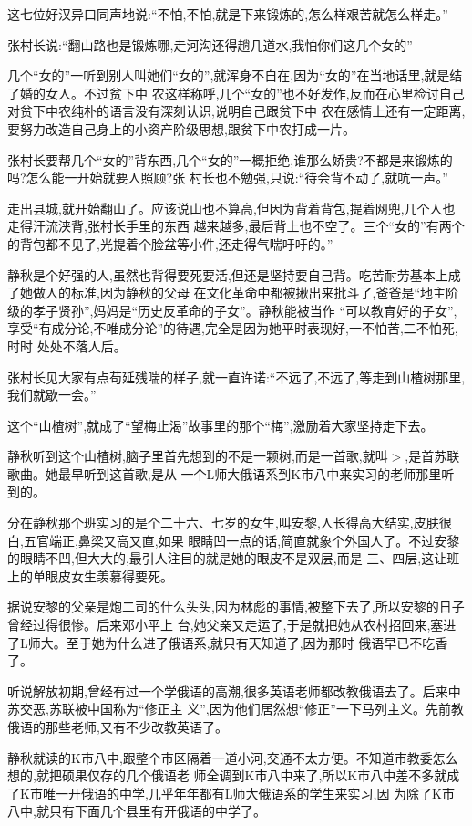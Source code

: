 ﻿\documentclass[12pt]{article}
\begin{document}
这七位好汉异口同声地说:``不怕,不怕,就是下来锻炼的,怎么样艰苦就怎么样走。''

张村长说:``翻山路也是锻炼哪,走河沟还得趟几道水,我怕你们这几个女的\myrule ''

几个``女的''一听到别人叫她们``女的'',就浑身不自在,因为``女的''在当地话里,就是结了婚的女人。不过贫下中
农这样称呼,几个``女的''也不好发作,反而在心里检讨自己对贫下中农纯朴的语言没有深刻认识,说明自己跟贫下中
农在感情上还有一定距离,要努力改造自己身上的小资产阶级思想,跟贫下中农打成一片。

张村长要帮几个``女的''背东西,几个``女的''一概拒绝,谁那么娇贵?不都是来锻炼的吗?怎么能一开始就要人照顾?张
村长也不勉强,只说:``待会背不动了,就吭一声。''

走出县城,就开始翻山了。应该说山也不算高,但因为背着背包,提着网兜,几个人也走得汗流浃背,张村长手里的东西
越来越多,最后背上也不空了。三个``女的''有两个的背包都不见了,光提着个脸盆等小件,还走得气喘吁吁的。''

静秋是个好强的人,虽然也背得要死要活,但还是坚持要自己背。吃苦耐劳基本上成了她做人的标准,因为静秋的父母
在文化革命中都被揪出来批斗了,爸爸是``地主阶级的孝子贤孙'',妈妈是``历史反革命的子女''。静秋能被当作
``可以教育好的子女'',享受``有成分论,不唯成分论''的待遇,完全是因为她平时表现好,一不怕苦,二不怕死,时时
处处不落人后。

张村长见大家有点苟延残喘的样子,就一直许诺:``不远了,不远了,等走到山楂树那里,我们就歇一会。''

这个``山楂树'',就成了``望梅止渴''故事里的那个``梅'',激励着大家坚持走下去。

静秋听到这个山楂树,脑子里首先想到的不是一颗树,而是一首歌,就叫$>$,是首苏联歌曲。她最早听到这首歌,是从
一个L师大俄语系到K市八中来实习的老师那里听到的。

分在静秋那个班实习的是个二十六、七岁的女生,叫安黎,人长得高大结实,皮肤很白,五官端正,鼻梁又高又直,如果
眼睛凹一点的话,简直就象个外国人了。不过安黎的眼睛不凹,但大大的,最引人注目的就是她的眼皮不是双层,而是
三、四层,这让班上的单眼皮女生羡慕得要死。

据说安黎的父亲是炮二司的什么头头,因为林彪的事情,被整下去了,所以安黎的日子曾经过得很惨。后来邓小平上
台,她父亲又走运了,于是就把她从农村招回来,塞进了L师大。至于她为什么进了俄语系,就只有天知道了,因为那时
俄语早已不吃香了。

听说解放初期,曾经有过一个学俄语的高潮,很多英语老师都改教俄语去了。后来中苏交恶,苏联被中国称为``修正主
义'',因为他们居然想``修正''一下马列主义。先前教俄语的那些老师,又有不少改教英语了。

静秋就读的K市八中,跟整个市区隔着一道小河,交通不太方便。不知道市教委怎么想的,就把硕果仅存的几个俄语老
师全调到K市八中来了,所以K市八中差不多就成了K市唯一开俄语的中学,几乎年年都有L师大俄语系的学生来实习,因
为除了K市八中,就只有下面几个县里有开俄语的中学了。
\end{document}
